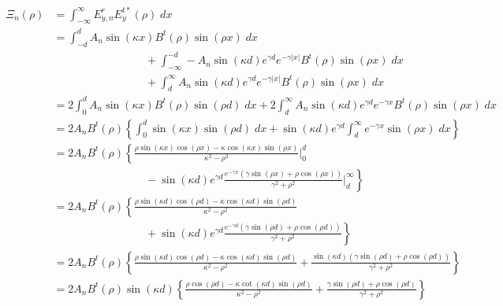 \documentclass[11pt, oneside]{article}   	%
\begin{document}
\begin{align*}
\Xi_{n}(\rho) &= \int_{-\infty}^{\infty} E_{y,n}^{r} E_{y}^{t*}(\rho) \; dx \\
&= \int_{-d}^{d} A_{n}\sin(\kappa x) B^{t}(\rho) \sin(\rho x) \; dx \\ 
	&\hspace{100pt} + \int_{-\infty}^{-d} -A_{n}\sin(\kappa d) e^{\gamma d} e^{-\gamma |x|} B^{t}(\rho)\sin(\rho x)\; dx \\
	&\hspace{100pt} + \int_{d}^{\infty}     A_{n}\sin(\kappa d) e^{\gamma d} e^{-\gamma |x|} B^{t}(\rho)\sin(\rho x)\; dx \\
&= 2 \int_{0}^{d} A_{n}\sin(\kappa x) B^{t}(\rho) \sin(\rho d) \; dx + 2 \int_{d}^{\infty}     A_{n}\sin(\kappa d) e^{\gamma d} e^{-\gamma x} B^{t}(\rho)\sin(\rho x)\; dx \\
&= 2 A_{n} B^{t}(\rho) \left\{ \int_{0}^{d} \sin(\kappa x) \sin(\rho d) \; dx + \sin(\kappa d) e^{\gamma d} \int_{d}^{\infty}  e^{-\gamma x}\sin(\rho x)\; dx \right\}\\
&= 2 A_{n} B^{t}(\rho) \left\{ \frac{\rho \sin(\kappa x) \cos(\rho x) - \kappa\cos(\kappa x)\sin(\rho x)}{\kappa^{2} - \rho^{2}} \bigg|_{0}^{d} \right. \\
	&\hspace{100pt} - \left. \sin(\kappa d) e^{\gamma d} \frac{e^{-\gamma x}(\gamma \sin(\rho x) + \rho \cos(\rho x))}{\gamma^{2} + \rho^{2}} \bigg|_{d}^{\infty} \right\}\\
&= 2 A_{n} B^{t}(\rho) \left\{ \frac{\rho \sin(\kappa d) \cos(\rho d) - \kappa\cos(\kappa d)\sin(\rho d)}{\kappa^{2} - \rho^{2}} \right. \\
	&\hspace{100pt} + \left. \sin(\kappa d) e^{\gamma d} \frac{e^{-\gamma d}(\gamma \sin(\rho d) + \rho \cos(\rho d))}{\gamma^{2} + \rho^{2}} \right\}\\
&= 2 A_{n} B^{t}(\rho) \left\{ \frac{\rho \sin(\kappa d) \cos(\rho d) - \kappa\cos(\kappa d)\sin(\rho d)}{\kappa^{2} - \rho^{2}} + \frac{\sin(\kappa d)(\gamma \sin(\rho d) + \rho \cos(\rho d))}{\gamma^{2} + \rho^{2}} \right\}\\
&= 2 A_{n} B^{t}(\rho) \sin(\kappa d)\left\{ \frac{\rho \cos(\rho d) - \kappa\cot(\kappa d)\sin(\rho d)}{\kappa^{2} - \rho^{2}} + \frac{\gamma \sin(\rho d) + \rho \cos(\rho d)}{\gamma^{2} + \rho^{2}} \right\}\\
\end{align*}
\end{document}
